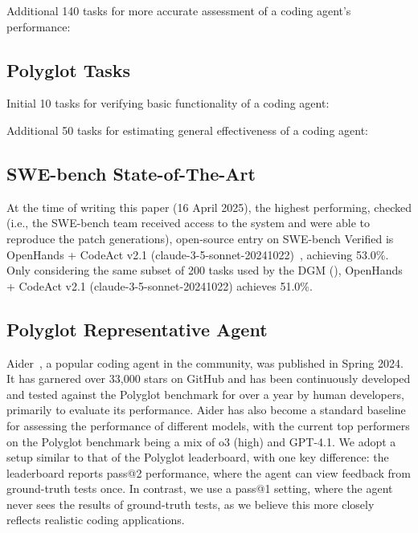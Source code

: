 \documentclass{article} %
\begin{document}
Additional 140 tasks for more accurate assessment of a coding agent's performance:


\subsection{Polyglot Tasks}
\label{app:polyglot-tasks}

Initial 10 tasks for verifying basic functionality of a coding agent:


Additional 50 tasks for estimating general effectiveness of a coding agent:


\subsection{SWE-bench State-of-The-Art}
\label{app:swebench-sota}
At the time of writing this paper (16 April 2025), the highest performing, checked (i.e., the SWE-bench team received access to the system and were able to reproduce the patch generations), open-source entry on SWE-bench Verified is OpenHands + CodeAct v2.1 (claude-3-5-sonnet-20241022)~\citep{wang2024openhands}, achieving 53.0\%. Only considering the same subset of 200 tasks used by the DGM (), OpenHands + CodeAct v2.1 (claude-3-5-sonnet-20241022) achieves 51.0\%.

\subsection{Polyglot Representative Agent}
\label{app:polyglot-sota}

Aider~\citep{aider2024}, a popular coding agent in the community, was published in Spring 2024. It has garnered over 33,000 stars on GitHub and has been continuously developed and tested against the Polyglot benchmark for over a year by human developers, primarily to evaluate its performance. Aider has also become a standard baseline for assessing the performance of different models, with the current top performers on the Polyglot benchmark being a mix of o3 (high) and GPT-4.1. We adopt a setup similar to that of the Polyglot leaderboard, with one key difference: the leaderboard reports pass@2 performance, where the agent can view feedback from ground-truth tests once. In contrast, we use a pass@1 setting, where the agent never sees the results of ground-truth tests, as we believe this more closely reflects realistic coding applications.
\end{document}

